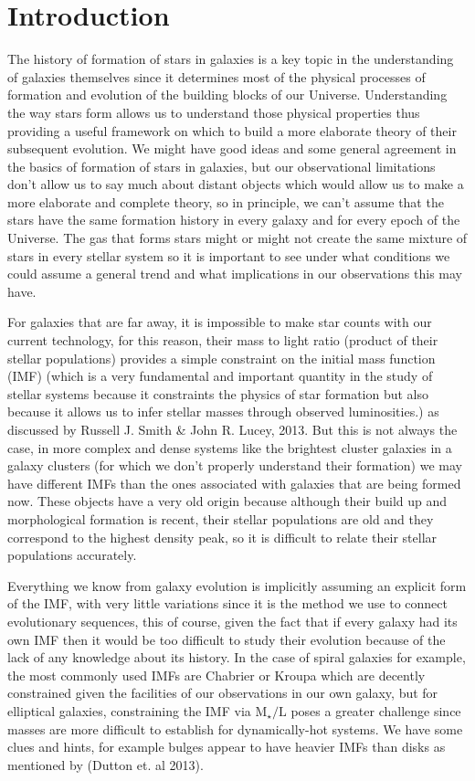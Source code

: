 \chapter{Introduction}

The history of formation of stars in galaxies is a key topic in the understanding of galaxies themselves since it determines most of the physical processes of formation and evolution of the building blocks of our Universe. Understanding the way stars form allows us to understand those physical properties thus providing a useful framework on which to build a more elaborate theory of their subsequent evolution. We might have good ideas and some general agreement in the basics of formation of stars in galaxies, but our observational limitations don't allow us to say much about distant objects which would allow us to make a more elaborate and complete theory, so in principle, we can't assume that the stars have the same formation history in every galaxy and for every epoch of the Universe. The gas that forms stars might or might not create the same mixture of stars in every stellar system so it is important to see under what conditions we could assume a general trend and what implications in our observations this may have. 

For galaxies that are far away, it is impossible to make star counts with our current technology, for this reason, their mass to light ratio (product of their stellar populations) provides a simple constraint on the initial mass function (IMF) (which is a very fundamental and important quantity in the study of stellar systems because it constraints the physics of star formation but also because it allows us to infer stellar masses through observed luminosities.) as  discussed by Russell J. Smith \& John R. Lucey, 2013. But this is not always the case, in more complex and dense systems like the brightest cluster galaxies in a galaxy clusters (for which we don't properly understand their formation) we may have different IMFs than the ones associated with galaxies that are being formed now. These objects have a very old origin because although their build up and morphological formation is recent, their stellar populations are old and they correspond to the highest density peak, so it is difficult to relate their stellar populations accurately.

Everything we know from galaxy evolution is implicitly assuming an explicit form of the IMF, with very little variations since it is the method we use to connect evolutionary sequences, this of course, given the fact that if every galaxy had its own IMF then it would be too difficult to study their evolution because of the lack of any knowledge about its history. In the case of spiral galaxies for example, the most commonly used IMFs are Chabrier or Kroupa which are decently constrained given the facilities of our observations in our own galaxy, but for elliptical galaxies, constraining the IMF via $\textrm{M}_{\star}/\textrm{L}$ poses a greater challenge since masses are more difficult to establish for dynamically-hot systems. We have some clues and hints, for example bulges appear to have heavier IMFs than disks as mentioned by (Dutton et. al 2013).

